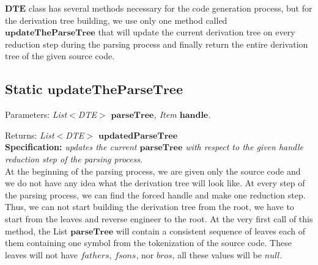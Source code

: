 \(\boldsymbol{DTE}\) class has several methods necessary for the code generation process, but for the derivation tree building, we use only one method called \(\boldsymbol{updateTheParseTree}\) that will update the current derivation tree on every reduction step during the parsing process and finally return the entire derivation tree of the given source code.

\vspace{10pt}

\subsection{Static \(\boldsymbol{updateTheParseTree}\)}

Parameters: \textit{List\(<\)DTE\(>\) \(\boldsymbol{parseTree}\), Item \(\boldsymbol{handle}\).}

Returns: \textit{List\(<\)DTE\(>\) \(\boldsymbol{updatedParseTree}\)}\\

\textbf{Specification:} \textit{updates the current \(\boldsymbol{parseTree}\) with respect to the given handle reduction step of the parsing process.}\\

At the beginning of the parsing process, we are given only the source code and we do not have any idea what the derivation tree will look like. At every step of the parsing process, we can find the forced handle and make one reduction step. Thus, we can not start building the derivation tree from the root, we have to start from the leaves and reverse engineer to the root. At the very first call of this method, the List \(\boldsymbol{parseTree}\) will contain a consistent sequence of leaves each of them containing one symbol from the tokenization of the source code. These leaves will not have \(fathers\), \(fsons\), nor \(bros\), all these values will be \(null\).\\

